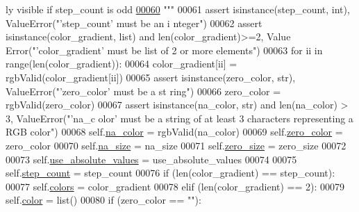 \begin{DoxyCode}
{      ly visible if step\_count is odd}
\hypertarget{displayConfig_8py_source_l00060}{}\hyperlink{classnavicom_1_1displayConfig_1_1DisplayConfig_a26387ee9e6fe63612bc87a4d5d4a17f2}{00060} \textcolor{stringliteral}{        """}
00061         \textcolor{keyword}{assert} isinstance(step\_count, int), ValueError(\textcolor{stringliteral}{"'step\_count' must be an i
      nteger"})
00062         \textcolor{keyword}{assert} isinstance(color\_gradient, list) \textcolor{keywordflow}{and} len(color\_gradient)>=2, Value
      Error(\textcolor{stringliteral}{"'color\_gradient' must be list of 2 or more elements"})
00063         \textcolor{keywordflow}{for} ii \textcolor{keywordflow}{in} range(len(color\_gradient)):
00064             color\_gradient[ii] = rgbValid(color\_gradient[ii])
00065         \textcolor{keyword}{assert} isinstance(zero\_color, str), ValueError(\textcolor{stringliteral}{"'zero\_color' must be a st
      ring"})
00066         zero\_color = rgbValid(zero\_color)
00067         \textcolor{keyword}{assert} isinstance(na\_color, str) \textcolor{keywordflow}{and} len(na\_color) > 3, ValueError(\textcolor{stringliteral}{"'na\_c
      olor' must be a string of at least 3 characters representing a RGB color"})
00068         self.\hyperlink{classnavicom_1_1displayConfig_1_1DisplayConfig_ad8f95c1e3b29ac5622a18b7328b07f50}{na_color} = rgbValid(na\_color)
00069         self.\hyperlink{classnavicom_1_1displayConfig_1_1DisplayConfig_a0309d659680f7db85475e025fced9c29}{zero_color} = zero\_color
00070         self.\hyperlink{classnavicom_1_1displayConfig_1_1DisplayConfig_aa157506adb33080de983987dd182fa29}{na_size} = na\_size
00071         self.\hyperlink{classnavicom_1_1displayConfig_1_1DisplayConfig_aab0e7c765bfc4071416c5e04fd7bbb2f}{zero_size} = zero\_size
00072 
00073         self.\hyperlink{classnavicom_1_1displayConfig_1_1DisplayConfig_a86870c1c1b5c920d4cc93554c7528d8a}{use_absolute_values} = use\_absolute\_values
00074 
00075         self.\hyperlink{classnavicom_1_1displayConfig_1_1DisplayConfig_a79144928881551fa1f1a18d062d761ea}{step_count} = step\_count
00076         \textcolor{keywordflow}{if} (len(color\_gradient) == step\_count):
00077             self.\hyperlink{classnavicom_1_1displayConfig_1_1DisplayConfig_ac0745c689a4132681e6dc8e525fecebc}{colors} = color\_gradient
00078         \textcolor{keywordflow}{elif} (len(color\_gradient) == 2):
00079             self.\hyperlink{classnavicom_1_1displayConfig_1_1DisplayConfig_acf7e4fcee4a2d6acb5f3641bacfa64c3}{color} = list()
00080             \textcolor{keywordflow}{if} (zero\_color == \textcolor{stringliteral}{""}):

\end{DoxyCode}
